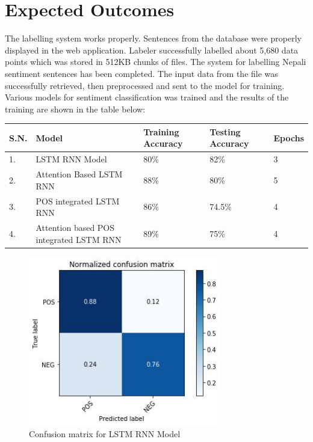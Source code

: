 	\chapter{Expected Outcomes}
    	The labelling system works properly. Sentences from the database were properly displayed in the web application. Labeler successfully labelled about 5,680 data points which was stored in 512KB chunks of files. The system for labelling Nepali sentiment sentences has been completed. The input data from the file was successfully retrieved, then preprocessed and sent to the model for training.
    	\vspace{0.2in}
    	Various models for sentiment classification was trained and the results of the training are shown in the table below:
    	
\begin{center}
    \begin{tabular}{|p{1cm}|p{3cm}|p{4cm}|p{4cm}|p{2cm}| }
        \hline
        S.N. & Model & Training Accuracy & Testing Accuracy & Epochs\\
        \hline
        1. & LSTM RNN Model & 80\% & 82\% & 3\\
        \hline
        2. & Attention Based LSTM RNN & 88\% & 80\% & 5 \\
        \hline
        3. & POS integrated LSTM RNN & 86\% & 74.5\% & 4 \\
        \hline
        4. & Attention based POS integrated LSTM RNN  & 89\% & 75\% & 4 \\
        \hline
    \end{tabular}
    \begin{figure}[h]
	    \centering
		    \includegraphics[width=0.75\textwidth]{./img/7.1.jpg}
		    \caption{Confusion matrix for LSTM RNN Model}
	\end{figure}
\end{center}	
